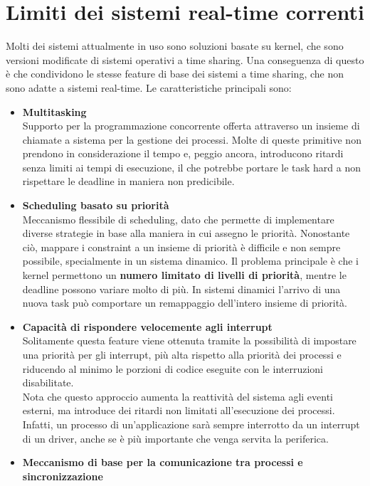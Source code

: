 \documentclass[12pt,openany,onesided]{book}
\begin{document}
\section{Limiti dei sistemi real-time correnti}
Molti dei sistemi attualmente in uso sono soluzioni basate su kernel, che sono versioni modificate di sistemi operativi a time sharing.
Una conseguenza di questo è che condividono le stesse feature di base dei sistemi a time sharing, che non sono adatte a sistemi real-time.
Le caratteristiche principali sono:
\begin{itemize}
\item \textbf{Multitasking}\\
    Supporto per la programmazione concorrente offerta attraverso un insieme di chiamate a sistema per la gestione dei processi. Molte di queste primitive
    non prendono in considerazione il tempo e, peggio ancora, introducono ritardi senza limiti ai tempi di esecuzione, il che potrebbe portare le task hard a non rispettare le deadline in maniera non predicibile.
\item \textbf{Scheduling basato su priorità}\\
    Meccanismo flessibile di scheduling, dato che permette di implementare diverse strategie in base alla maniera in cui assegno le priorità.
    Nonostante ciò, mappare i constraint a un insieme di priorità è difficile e non sempre possibile, specialmente in un sistema dinamico.
    Il problema principale è che i kernel permettono un \textbf{numero limitato di livelli di priorità}, mentre le deadline possono variare molto di più.
    In sistemi dinamici l'arrivo di una nuova task può comportare un remappaggio dell'intero insieme di priorità.
\item \textbf{Capacità di rispondere velocemente agli interrupt}\\
    Solitamente questa feature viene ottenuta tramite la possibilità di impostare una priorità per gli interrupt, più alta rispetto alla priorità dei processi e 
    riducendo al minimo le porzioni di codice eseguite con le interruzioni disabilitate.
    \\
    Nota che questo approccio aumenta la reattività del sistema agli eventi esterni, ma introduce dei ritardi non limitati all'esecuzione dei processi.
    Infatti, un processo di un'applicazione sarà sempre interrotto da un interrupt di un driver, anche se è più importante che venga servita la periferica.
\item \textbf{Meccanismo di base per la comunicazione tra processi e sincronizzazione}\\

\end{itemize}
\end{document}
